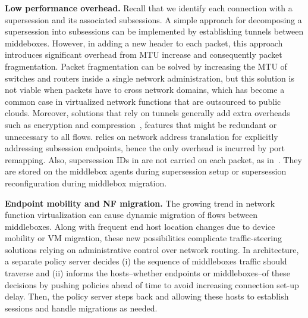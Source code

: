 {\bf   Low  performance overhead.}   Recall    that we  identify  each
connection  with a   supersession and  its   associated subsessions. A
simple approach for decomposing a supersession into subsessions can be
implemented by establishing  tunnels between middeboxes.   However, in
adding a  new  header  to   each  packet,  this  approach   introduces
significant  overhead   from MTU  increase    and consequently  packet
fragmentation. Packet fragmentation  can  be solved by  increasing the
MTU of switches  and routers inside  a single  network administration,
but this  solution is not  viable when packets  have  to cross network
domains,  which   has become  a  common   case in virtualized  network
functions that are outsourced to  public clouds.  Moreover,  solutions
that rely on tunnels generally add extra  overheads such as encryption
and compression~\cite{Aplomb}, features  that  might be   redundant or
unnecessary  to   all   flows.  \system   relies   on network  address
translation for explicitly  addressing subsession endpoints, hence the
only overhead is incurred by  port remapping.  Also, supersession  IDs
in \system are not carried on each  packet, as in~\cite{DOA}. They are
stored   on the   middlebox   agents  during  supersession   setup  or
supersession reconfiguration during middlebox migration.

{\bf  Endpoint  mobility and  NF   migration.}  
The growing trend in network function virtualization can cause dynamic
migration of flows between  middleboxes. Along with frequent  end host
location changes  due to device mobility  or  VM migration,  these new
possibilities  complicate     traffic-steering  solutions  relying  on
administrative control over network routing.  In \system architecture,
a  separate policy  server decides  (i)   the sequence of  middleboxes
traffic should traverse and  (ii) informs the hosts--whether endpoints
or  middleboxes--of these decisions by pushing  policies ahead of time
to avoid increasing connection set-up  delay.  Then, the policy server
steps back  and allowing these  hosts to establish sessions and handle
migrations as needed.



